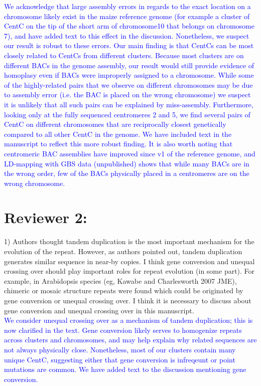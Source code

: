 \documentclass[]{article}
\newcommand{\res}[1]{\noindent \textcolor{blue}{{#1}} \\}
\begin{document}
\res{We acknowledge that large assembly errors in regards to the exact location on a chromosome likely exist in the maize reference genome (for example a cluster of CentC on the tip of the short arm of chromosome10 that belongs on chromosome 7), and have added text to this effect in the discussion.  
Nonetheless, we suspect our result is robust to these errors.
Our main finding is that CentCs can be most closely related to CentCs from different clusters.
Because most clusters are on different BACs in the genome assembly, our result would still provide evidence of homoplasy even if BACs were improperly assigned to a chromosome. 
While some of the highly-related pairs that we observe on different chromosomes may be due to assembly error (i.e. the BAC is placed on the wrong chromosome) we suspect it is unlikely that all such pairs can be explained by miss-assembly.  
Furthermore, looking only at the fully sequenced centromeres 2 and 5, we find several pairs of CentC on different chromosomes that are reciprocally closest genetically compared to all other CentC in the genome.  
We have included text in the manuscript to reflect this more robust finding. 
It is also worth noting that centromeric BAC assemblies have improved since v1 of the reference genome, and LD-mapping with GBS data (unpublished) shows that while many BACs are in the wrong order, few of the BACs physically placed in a centromeres are on the wrong chromosome. }

\section*{Reviewer 2:}

1) Authors thought tandem duplication is the most important mechanism for the evolution of the repeat. However, as authors pointed out, tandem duplication generates similar sequence in near-by copies. I think gene conversion and unequal crossing over should play important roles for repeat evolution (in some part). For example, in Arabidopsis species (eg, Kawabe and Charlesworth 2007 JME), chimeric or mosaic structure repeats were found which could be originated by gene conversion or unequal crossing over. I think it is necessary to discuss about gene conversion and unequal crossing over in this manuscript.\\

\res{We consider unequal crossing over as a mechanism of tandem duplication; this is now clarified in the text.
Gene conversion likely serves to homogenize repeats across clusters and chromosomes, and may help explain why related sequences are not always physically close.
Nonetheless, most of our clusters contain many unique CentC, suggesting either that gene conversion is infreqeunt or point mutations are common. 
We have added text to the discussion mentioning gene conversion.} 
\end{document}
